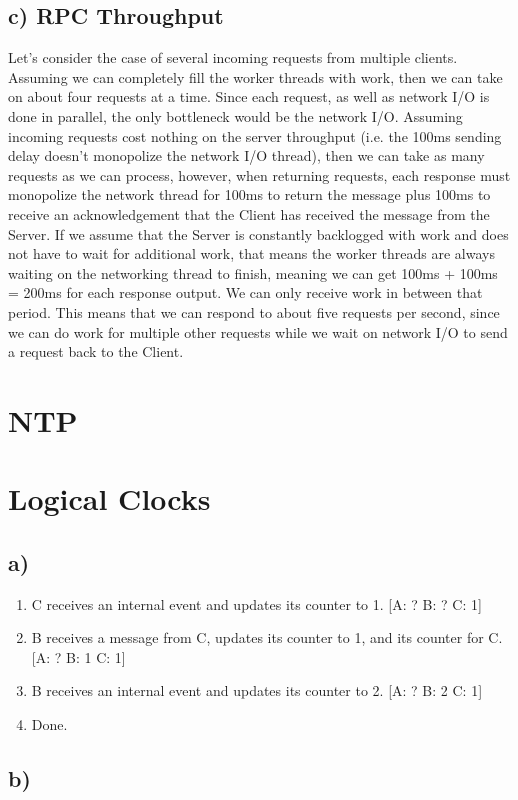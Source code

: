\documentclass[12pt]{article}
\begin{document}
\subsection*{c) RPC Throughput}
Let's consider the case of several incoming requests from multiple clients. Assuming we can completely fill the worker threads with work, then we can take on about four requests at a time. Since each request, as well as network I/O is done in parallel, the only bottleneck would be the network I/O. Assuming incoming requests cost nothing on the server throughput (i.e. the 100ms sending delay doesn't monopolize the network I/O thread), then we can take as many requests as we can process, however, when returning requests, each response must monopolize the network thread for 100ms to return the message plus 100ms to receive an acknowledgement that the Client has received the message from the Server. If we assume that the Server is constantly backlogged with work and does not have to wait for additional work, that means the worker threads are always waiting on the networking thread to finish, meaning we can get 100ms + 100ms = 200ms for each response output. We can only receive work in between that period. This means that we can respond to about five requests per second, since we can do work for multiple other requests while we wait on network I/O to send a request back to the Client.
\section{NTP}
\section{Logical Clocks}
\subsection*{a)}
\begin{enumerate}
\item C receives an internal event and updates its counter to 1. [A: ? B: ? C: 1]
\item B receives a message from C, updates its counter to 1, and its counter for C. [A: ? B: 1 C: 1]
\item B receives an internal event and updates its counter to 2. [A: ? B: 2 C: 1]
\item Done.
\end{enumerate}
\subsection*{b)}
\end{document}
